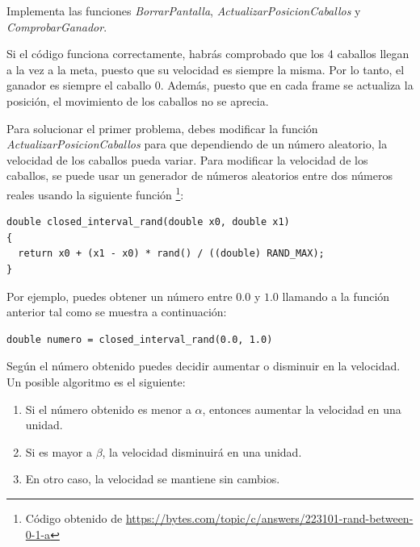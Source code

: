 \begin{exercise}
	Implementa las funciones \textit{BorrarPantalla}, \textit{ActualizarPosicionCaballos} y \textit{ComprobarGanador}.
\end{exercise}

Si el código funciona correctamente, habrás comprobado que los 4 caballos llegan a la vez a la meta, puesto que su velocidad es siempre la misma. Por lo tanto, el ganador es siempre el caballo 0. Además, puesto que en cada frame se actualiza la posición, el movimiento de los caballos no se aprecia. 

Para solucionar el primer problema, debes modificar la función \textit{ActualizarPosicionCaballos} para que dependiendo de un número aleatorio, la velocidad de los caballos pueda variar. Para modificar la velocidad de los caballos, se puede usar un generador de números aleatorios entre dos números reales usando la siguiente función \footnote{Código obtenido de \url{https://bytes.com/topic/c/answers/223101-rand-between-0-1-a}}:

\begin{example}
\begin{lstlisting}
double closed_interval_rand(double x0, double x1)
{
  return x0 + (x1 - x0) * rand() / ((double) RAND_MAX);
}
\end{lstlisting}
\end{example}

Por ejemplo, puedes obtener un número entre $0.0$ y $1.0$ llamando a la función anterior tal como se muestra a continuación:

\begin{example}
\begin{lstlisting}
double numero = closed_interval_rand(0.0, 1.0)
\end{lstlisting}
\end{example}

Según el número obtenido puedes decidir aumentar o disminuir en la velocidad. Un posible algoritmo es el siguiente:

\begin{enumerate}
\item Si el número obtenido es menor a $\alpha$, entonces aumentar la velocidad en una unidad.
%
\item Si es mayor a $\beta$, la velocidad disminuirá en una unidad. 
%
\item  En otro caso, la velocidad se mantiene sin cambios. 
\end{enumerate}

